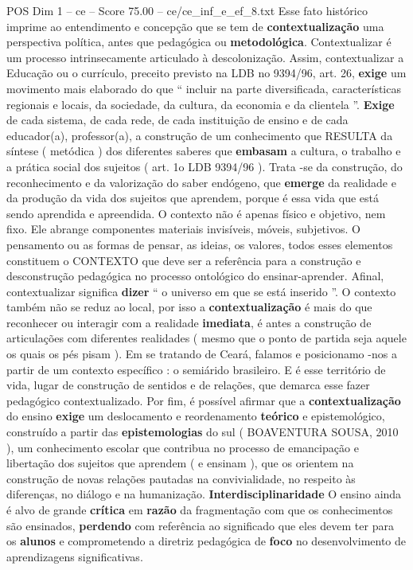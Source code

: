\begin{textsample}{POS Dim 1 – ce – Score 75.00 – ce/ce\_inf\_e\_ef\_8.txt}
Esse fato histórico imprime ao entendimento e concepção que se tem de \textbf{contextualização} uma perspectiva política, antes que pedagógica ou \textbf{metodológica}.
Contextualizar é um processo intrinsecamente articulado à descolonização.
Assim, contextualizar a Educação ou o currículo, preceito previsto na LDB no 9394/96, art. 26, \textbf{exige} um movimento mais elaborado do que “ incluir na parte diversificada, características regionais e locais, da sociedade, da cultura, da economia e da clientela ”. \textbf{Exige} de cada sistema, de cada rede, de cada instituição de ensino e de cada educador(a), professor(a), a construção de um conhecimento que RESULTA da síntese ( metódica ) dos diferentes saberes que \textbf{embasam} a cultura, o trabalho e a prática social dos sujeitos ( art. 1o LDB 9394/96 ).
Trata -se da construção, do reconhecimento e da valorização do saber endógeno, que \textbf{emerge} da realidade e da produção da vida dos sujeitos que aprendem, porque é essa vida que está sendo aprendida e apreendida.
O contexto não é apenas físico e objetivo, nem fixo.
Ele abrange componentes materiais invisíveis, móveis, subjetivos.
O pensamento ou as formas de pensar, as ideias, os valores, todos esses elementos constituem o CONTEXTO que deve ser a referência para a construção e desconstrução pedagógica no processo ontológico do ensinar-aprender.
Afinal, contextualizar significa \textbf{dizer} “ o universo em que se está inserido ”.
O contexto também não se reduz ao local, por isso a \textbf{contextualização} é mais do que reconhecer ou interagir com a realidade \textbf{imediata}, é antes a construção de articulações com diferentes realidades ( mesmo que o ponto de partida seja aquele os quais os pés pisam ).
Em se tratando de Ceará, falamos e posicionamo -nos a partir de um contexto específico : o semiárido brasileiro.
E é esse território de vida, lugar de construção de sentidos e de relações, que demarca esse fazer pedagógico contextualizado.
Por fim, é possível afirmar que a \textbf{contextualização} do ensino \textbf{exige} um deslocamento e reordenamento \textbf{teórico} e epistemológico, construído a partir das \textbf{epistemologias} do sul ( BOAVENTURA SOUSA, 2010 ), um conhecimento escolar que contribua no processo de emancipação e libertação dos sujeitos que aprendem ( e ensinam ), que os orientem na construção de novas relações pautadas na convivialidade, no respeito às diferenças, no diálogo e na humanização. \textbf{Interdisciplinaridade} O ensino ainda é alvo de grande \textbf{crítica} em \textbf{razão} da fragmentação com que os conhecimentos são ensinados, \textbf{perdendo} com referência ao significado que eles devem ter para os \textbf{alunos} e comprometendo a diretriz pedagógica de \textbf{foco} no desenvolvimento de aprendizagens significativas.

\end{textsample}
